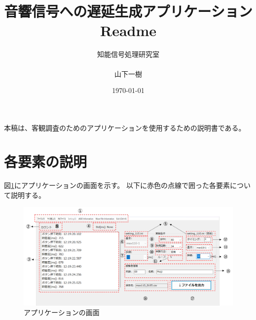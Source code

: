 \documentclass{article} %
\title{音響信号への遅延生成アプリケーション Readme} %
\author{知能信号処理研究室\\\\山下一樹} %
\date{\today} %
\begin{document}
\maketitle %
本稿は、客観調査のためのアプリケーションを使用するための説明書である。
\section{各要素の説明} 
図\ref{fig:app_kyakkann}にアプリケーションの画面を示す。
以下に赤色の点線で囲った各要素について説明する。
\begin{figure}[tbp]
  \centering
  \includegraphics[scale=0.5]{figures_app_1.pdf}
  \caption{アプリケーションの画面}
  \label{fig:app_kyakkann}
\end{figure}
\end{document}

